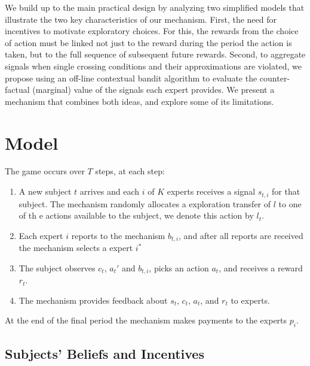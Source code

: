 


We build up to the main practical design by analyzing two simplified models that illustrate the two key characteristics of our mechanism. 
First, the need for incentives to motivate exploratory choices.
For this, the rewards from the choice of action must be linked not just to the reward during the period the action is taken, but to the full sequence of subsequent future rewards.
Second, to aggregate signals when single crossing conditions and their approximations are violated, we propose using an off-line contextual bandit algorithm to evaluate the counter-factual (marginal) value of the signals each expert provides.
We present a mechanism that combines both ideas, and explore some of its limitations.



\section{Model}

The game occurs over $T$ steps, at each step: 

\begin{enumerate}
\item A new subject $t$ arrives and each $i$ of $K$ experts receives a signal $s_{t,i}$ for that subject. The mechanism  randomly allocates a exploration transfer of $l$ to one of th e actions available to the subject, we denote this action by $l_t$.
\item Each expert $i$ reports to the mechanism ${b}_{t,i}$, and after all reports are received the mechanism selects a expert $i^{*}$ 
\item The subject observes $c_t$, $a_t'$ and ${b}_{t,i}$, picks an action $a_t$, and receives a reward $r_t$.
\item The mechanism provides feedback about $s_t$, $c_t$, $a_t$, and $r_t$ to experts.
\end{enumerate}

At the end of the final period the mechanism makes payments to the experts $p_i$.


\subsection{Subjects' Beliefs and Incentives}

